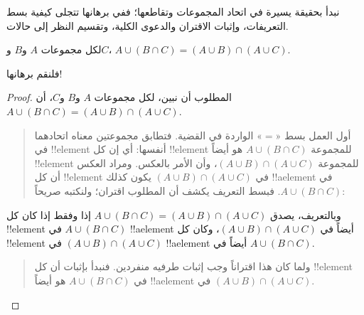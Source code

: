 \documentclass[../../../include/open-logic-section]{subfiles}
\begin{document}


نبدأ بحقيقة يسيرة في اتحاد المجموعات وتقاطعها؛ ففي برهانها تتجلى
كيفية بسط التعريفات، وإثبات الاقتران والدعوى الكلية، وتقسيم النظر إلى
حالات.

\begin{prop}
لكل مجموعات $A$ و$B$ و$C$،
$A \cup (B \cap C) = (A \cup B) \cap (A \cup C)$.
\end{prop}

فلنقم برهانها!{}

\begin{proof}
المطلوب أن نبين، لكل مجموعات $A$ و$B$ و$C$، أن
$A \cup (B \cap C) = (A \cup B) \cap (A \cup C)$.
\begin{quote}
أول العمل بسط «$=$» الواردة في القضية. فتطابق مجموعتين معناه اتحادهما
في !!{element} أنفسها: أي إن كل !!{element} للمجموعة
$A \cup (B \cap C)$ هو أيضاً !!{element} للمجموعة
$(A \cup B) \cap (A \cup C)$، وأن الأمر بالعكس. ومراد العكس أن كل
!!{element} في $(A \cup B) \cap (A \cup C)$ يكون كذلك
!!a{element} في $A \cup (B \cap C)$. فبسط التعريف يكشف أن المطلوب
اقتران؛ ولنكتبه صريحاً:
\end{quote}
وبالتعريف، يصدق
$A \cup (B \cap C) = (A \cup B) \cap (A \cup C)$ إذا وفقط إذا كان كل
!!{element} في $A \cup (B \cap C)$ !!a{element} أيضاً في
$(A \cup B) \cap (A \cup C)$، وكان كل !!{element} في
$(A \cup B) \cap (A \cup C)$ !!a{element} أيضاً في
$A \cup (B \cap C)$.
\begin{quote}
ولما كان هذا اقتراناً وجب إثبات طرفيه منفردين. فنبدأ بإثبات أن كل
!!{element} في $A \cup (B \cap C)$ هو أيضاً !!a{element} في
$(A \cup B) \cap (A \cup C)$.


\end{quote}
\end{proof}
\end{document}
